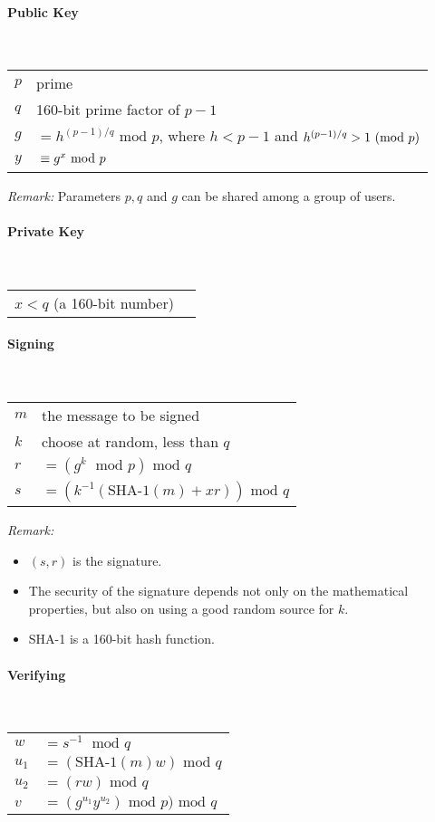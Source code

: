 \begin{cryptoprocedure}
\paragraph{Public Key}\strut\\
\begin{tabular}{l@{ }l}
$p$ & prime \\
$q$ & 160-bit prime factor of $p - 1$ \\
$g$ & $ = h^{(p-1)/q}  \mbox{ mod } p$, where $h < p - 1$ and
$h^{(p-1)/q} > 1  \ (\mbox{mod }p)$ \\
$y$ & $\strut \equiv  g^x  \mbox{ mod } p$ 
\end{tabular}

\emph{Remark:} Parameters $p,q$ and $g$ can be shared among a group of users.

\paragraph{Private Key}\strut\\
\begin{tabular}{l@{ }l}
$x < q$ (a 160-bit number) 
\end{tabular}

\paragraph{Signing}\strut\\
\begin{tabular}{l@{ }l}
$m$ & the message to be signed\\
$k$ & choose at random\index{Random}, less than $q$\\
$r$ & $= (g^k \; \mbox{ mod } p) \mbox{ mod } q$\\
$s$ & $= (k^{-1}(\mbox{SHA-1}(m) + xr)) \mbox{ mod } q$
\end{tabular}

\emph{Remark:}
\begin{itemize}
\item $(s,r)$ is the signature.
\item The security of the signature depends not only on the mathematical
  properties, but also on using a good random source  for $k$.
\item SHA-1  is a 160-bit hash function.
\end{itemize}
\paragraph{Verifying}\strut\\
\begin{tabular}{l@{ }l}
$w$ & $= s^{-1} \;  \mbox{ mod } q$\\
$u_1$ & $= (\mbox{SHA-1}(m)w) \mbox{ mod } q$\\
$u_2$ & $= (rw)  \mbox{ mod } q$\\
$v$ & $= (g^{u_1}y^{u_2}) \mbox{ mod } p)  \mbox{ mod } q$\\


\end{tabular}
\end{cryptoprocedure}
